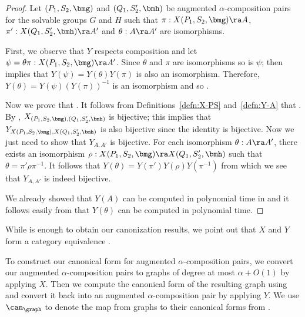 \begin{proof}
  Let $(P_1, S_2, \bmg)$ and $(Q_1, S_2', \bmh)$ be augmented $\alpha$-composition pairs for the solvable groups $G$ and $H$ such that $\pi : X(P_1, S_2, \bmg) \ra A$, $\pi' : X(Q_1, S_2', \bmh) \ra A'$ and $\theta : A \ra A'$ are isomorphisms.
  
  First, we observe that $Y$ respects composition and let $\psi = \theta \pi : X(P_1, S_2, \bmg) \ra A'$.  Since $\theta$ and $\pi$ are isomorphisms so is $\psi$;  then implies that $Y(\psi) = Y(\theta) Y(\pi)$ is also an isomorphism.  Therefore, $Y(\theta) = Y(\psi) (Y(\pi))^{-1}$ is an isomorphism and so .

  Now we prove that .  It follows from Definitions~\ref{defn:X-PS} and~\ref{defn:Y-A} that .  By , $X_{(P_1, S_2, \bmg), (Q_1, S_2', \bmh)}$ is bijective; this implies that $Y_{X(P_1, S_2, \bmg), X(Q_1, S_2', \bmh)}$ is also bijective since the identity is bijective.  Now we just need to show that $Y_{A, A'}$ is bijective.  For each isomorphism $\theta : A \ra A'$, there exists an isomorphism $\rho : X(P_1, S_2, \bmg) \ra X(Q_1, S_2', \bmh)$ such that $\theta = \pi' \rho \pi^{-1}$.  It follows that $Y(\theta) = Y(\pi') Y(\rho) Y(\pi^{-1})$ from which we see that $Y_{A, A'}$ is indeed bijective.

  We already showed that $Y(A)$ can be computed in polynomial time in  and it follows easily from  that $Y(\theta)$ can be computed in polynomial time.
\end{proof}

While  is enough to obtain our canonization results, we point out that $X$ and $Y$ form a category equivalence .

To construct our canonical form for augmented $\alpha$-composition pairs, we convert our augmented $\alpha$-composition pairs to graphs of degree at most $\alpha + O(1)$ by applying $X$.  Then we compute the canonical form of the resulting graph using  and convert it back into an augmented $\alpha$-composition pair by applying $Y$.  We use $\can_{\graph}$ to denote the map from graphs to their canonical forms from .

